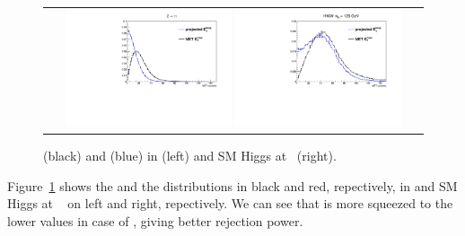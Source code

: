 \begin{figure}[htp] 
\centering 
\begin{tabular}{c} 
\includegraphics[width=0.45\textwidth]{figures/pmet_met_ztt.pdf} 
\includegraphics[width=0.45\textwidth]{figures/pmet_met_hww125.pdf} 
\end{tabular} 
\caption{\met(black) and \pmet(blue) in \dytt{}(left) and SM Higgs at ~\GeV(right).}
\label{fig:projmet} 
\end{figure}  
Figure~\ref{fig:projmet} shows the \met{} and the \pmet{} distributions 
in black and red, repectively, in \dytt{} and SM Higgs at ~\GeV 
on left and right, repectively. We can see that \pmet is more squeezed to 
the lower values in case of \dytt, giving better rejection power.  

